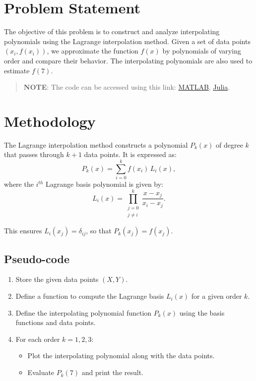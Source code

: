 \section*{Problem Statement}
The objective of this problem is to construct and analyze interpolating polynomials using the Lagrange interpolation method. Given a set of data points $(x_i, f(x_i))$, we approximate the function $f(x)$ by polynomials of varying order and compare their behavior. The interpolating polynomials are also used to estimate $f(7)$.

\begin{quote}
  \textbf{NOTE}: The code can be accessed using this link: \href{https://raw.githubusercontent.com/HavokSahil/computational-techniques-assignments/refs/heads/main/assignment3/a1.m}{MATLAB}, \href{https://raw.githubusercontent.com/HavokSahil/computational-techniques-assignments/refs/heads/main/assignment3/a1.jl}{Julia}.
\end{quote}


\section*{Methodology}
The Lagrange interpolation method constructs a polynomial $P_k(x)$ of degree $k$ that passes through $k+1$ data points. It is expressed as:
\[
  P_k(x) = \sum_{i=0}^{k} f(x_i) \, L_i(x),
\]
where the $i^{th}$ Lagrange basis polynomial is given by:
\[
  L_i(x) = \prod_{\substack{j=0 \\ j \neq i}}^{k} \frac{x - x_j}{x_i - x_j}.
\]

This ensures $L_i(x_j) = \delta_{ij}$, so that $P_k(x_j) = f(x_j)$.

\subsection*{Pseudo-code}
\begin{enumerate}
  \item Store the given data points $(X, Y)$.
  \item Define a function to compute the Lagrange basis $L_i(x)$ for a given order $k$.
  \item Define the interpolating polynomial function $P_k(x)$ using the basis functions and data points.
  \item For each order $k = 1, 2, 3$:
    \begin{itemize}
      \item Plot the interpolating polynomial along with the data points.
      \item Evaluate $P_k(7)$ and print the result.
    \end{itemize}
\end{enumerate}


